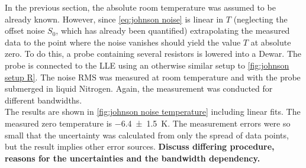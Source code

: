\documentclass[
    parskip=half, 
    twoside=false,
    twocolumn=true,
    fontsize=11pt,
]{scrarticle}
\begin{document}
In the previous section, the absolute room temperature was assumed to be already known. However, since \autoref{eq:johnson noise} is linear in $T$ (neglecting the offset noise $S_0$, which has already been quantified) extrapolating the measured data to the point where the noise vanishes should yield the value $T$ at absolute zero. To do this, a probe containing several resistors is lowered into a Dewar. The probe is connected to the LLE using an otherwise similar setup to \autoref{fig:johnson setup R}. The noise RMS was measured at room temperature and with the probe submerged in liquid Nitrogen. Again, the measurement was conducted for different bandwidths. \\
The results are shown in \autoref{fig:johnson noise temperature} including linear fits.
The measured zero temperature is \SI{-6.4(15)}{K}. The measurement errors were so small that the uncertainty was calculated from only the spread of data points, but the result implies other error sources.
\textbf{Discuss differing procedure, reasons for the uncertainties and the bandwidth dependency.}
\end{document}
